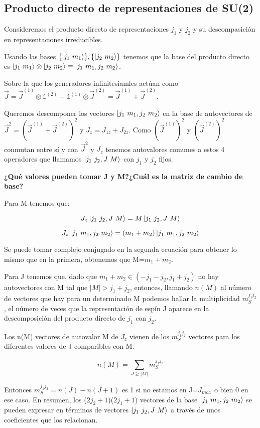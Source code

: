 \subsection{Producto directo de representaciones de SU(2)}

Consideremos el producto directo de representaciones $j_1$ y $ j_2$ y su descompasición en representaciones irreducibles.

Usando las bases $\{ \ket{j_1 \ m_1}\}, \{ \ket{j_2 \ m_2} \}$ tenemos que la base del producto directo es $ \ket{j_1 \ m_1} \otimes \ket{j_2 \ m_2} \equiv \ket{ j _1 \ m_1 , j_2 \ m_2}$.

Sobre la que los generadores infinitesiamles actúan como $\Vec{J}= \Vec{J}^{(1)}\otimes \mathds{1}^{(2)} + \mathds{1}^{(1)}\otimes \Vec{J}^{(2)} =\Vec{J}^{(1)} + \Vec{J}^{(2)}$.

\smallskip
Queremos descomponer los vectores $\ket{ j _1 \ m_1 , j_2 \ m_2}$ en la base de autovectores de $\Vec{J}^2=(\Vec{J}^{(1)} + \Vec{J}^{(2)})^2$ y $J_z=J_{1z}+J_{2z}$. Como $\left ( \Vec{J}^{(1)}\right)^2$ y $\left ( \Vec{J}^{(2)}\right)^2$ conmutan entre sí y con $\Vec{J}^2$ y $J_z$ tenemos autovalores comunes a estos 4 operadores que llamamos $\ket{j_1 \ j_2 , J \ M}$ con $j_1$ y $j_2$ fijos.

\bigskip
\textbf{¿Qué valores pueden tomar J y M?}\textbf{¿Cuál es la matriz de cambio de base?}

\smallskip
Para M tenemos que:

$$J_z\ket{j_1 \ j_2 , J \ M} = M \ket{j_1 \ j_2 , J \ M}$$

$$J_z\ket{j_1 \ m_1 , j_2 \ m_2}=(m_1+m_2)\ket{j_1 \ m_1 , j_2 \ m_2}$$

Se puede tomar complejo conjugado en la segunda ecuación para obtener lo mismo que en la primera, obtenemos que M=$m_1+m_2$.

\smallskip
Para J tenemos que, dado que $m_1+m_2 \in (-j_1-j_2,j_1+j_2)$ no hay autovectores con M tal que $|M|>j_1+j_2$, entonces, llamando $n(M)$ al número de vectores que hay para un determinado M podemos hallar la multiplicidad $m_S^{j_1j_2}$, el número de veces que la representación de espín J aparece en la descomposición del producto directo de $j_1$ con $j_2$.

\smallskip
Los n(M) vectores de autovalor M de $J_z$ vienen de los $m_S^{j_1j_2}$ vectores para los diferentes valores de J comparibles con M.

$$n(M)= \sum _{J\geq |M|}m_S^{j_1j_2}$$

Entonces $m_S^{j_1j_2} = n(J)-n(J+1)$ es 1 si no estamos en J=$J_{max}$ o bien 0 en ese caso. En resumen, los ($2j_2 + 1$)($2j_1+1$) vectores de la base $\ket{j_1 \ m_1,j_2 \ m_2}$ se pueden expresar en términos de vectores $\ket{j_1 \ j_2, J \ M}$ a través de unos coeficientes que los relacionan.

